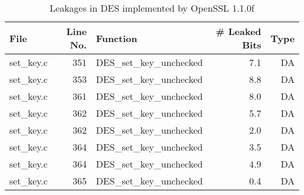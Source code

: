 \begin{table}[!ht]
\centering\tiny\scriptsize
\caption{Leakages in DES implemented by OpenSSL 1.1.0f}\label{tab:DESOpenSSL1.1.0f}
\begin{tabular}{lrlrr}
\hline
\textbf{File} & \textbf{Line No.} & \textbf{Function} & \textbf{\# Leaked Bits} & \textbf{Type} \\\hline
set\_key.c& 351&DES\_set\_key\_unchecked&7.1 &DA\\
set\_key.c& 353&DES\_set\_key\_unchecked&8.8 &DA\\
set\_key.c& 361&DES\_set\_key\_unchecked&8.0 &DA\\
set\_key.c& 362&DES\_set\_key\_unchecked&5.7 &DA\\
set\_key.c& 362&DES\_set\_key\_unchecked&2.0 &DA\\
set\_key.c& 364&DES\_set\_key\_unchecked&3.5 &DA\\
set\_key.c& 364&DES\_set\_key\_unchecked&4.9 &DA\\
set\_key.c& 365&DES\_set\_key\_unchecked&0.4 &DA\\
\hline
\end{tabular}
\renewcommand{\baselinestretch}{1.0}\selectfont
\end{table}
